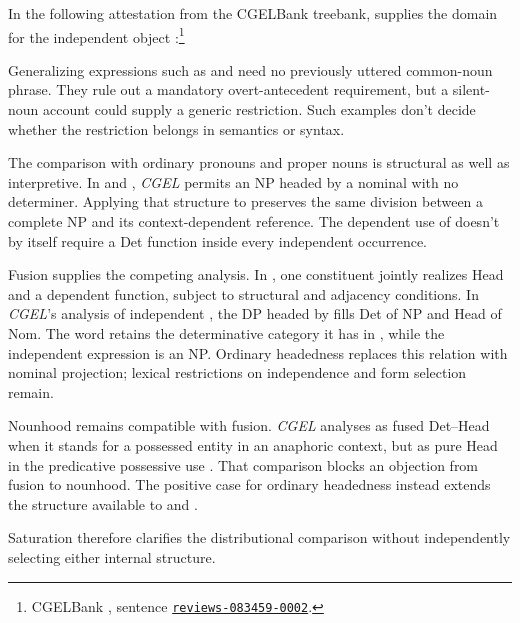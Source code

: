 \documentclass[12pt]{article}
\begin{document}
In the following attestation from the CGELBank treebank,  supplies the domain for the independent object :\footnote{CGELBank \citep{reynolds2023unified}, sentence \href{https://github.com/nert-nlp/cgel/blob/d0a2c2d8c522b23d5aa879fc9cb94948f4285b2c/datasets/ewt.cgel\#L651-L654}{\nolinkurl{reviews-083459-0002}}.}
\ea\label{ex:attested-both}
\z

Generalizing expressions such as  and  need no previously uttered common-noun phrase. They rule out a mandatory overt-antecedent requirement, but a silent-noun account could supply a generic restriction. Such examples don't decide whether the restriction belongs in semantics or syntax.

The comparison with ordinary pronouns and proper nouns is structural as well as interpretive. In  and , \textit{CGEL} permits an NP headed by a nominal with no determiner. Applying that structure to  preserves the same division between a complete NP and its context-dependent reference. The dependent use of  doesn't by itself require a Det function inside every independent occurrence.

Fusion supplies the competing analysis. In \textcite{Payne2007}, one constituent jointly realizes Head and a dependent function, subject to structural and adjacency conditions. In \textit{CGEL}'s analysis of independent , the DP headed by  fills Det of NP and Head of Nom. The word retains the determinative category it has in , while the independent expression is an NP. Ordinary headedness replaces this relation with nominal projection; lexical restrictions on independence and form selection remain.

Nounhood remains compatible with fusion. \textit{CGEL} analyses  as fused Det--Head when it stands for a possessed entity in an anaphoric context, but as pure Head in the predicative possessive use  \citep[410--411]{huddleston2002}. That comparison blocks an objection from fusion to nounhood. The positive case for ordinary headedness instead extends the structure available to  and .

Saturation therefore clarifies the distributional comparison without independently selecting either internal structure.
\end{document}
